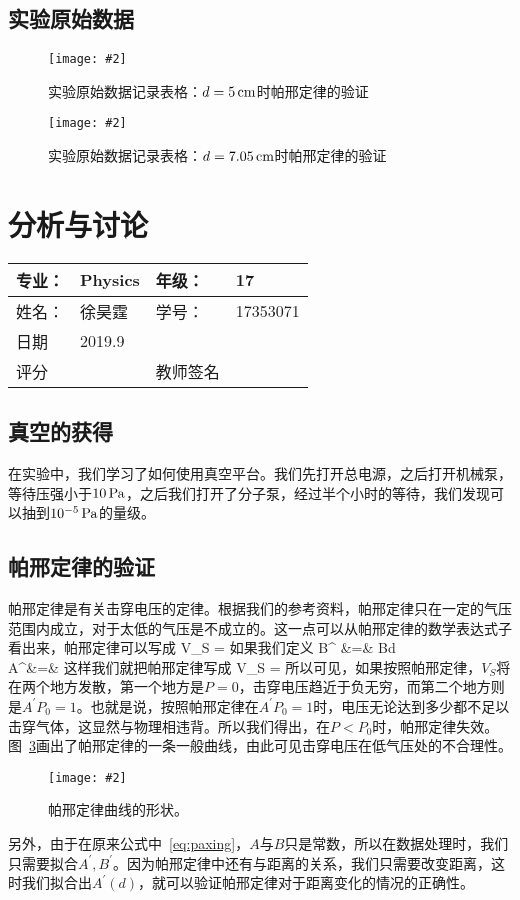 \documentclass{ctexart}
\newcommand{\cpic}[2]{
\begin{center}
\texttt{[image: \#2]}
\end{center}
}
\newcommand{\cpicn}[3]
{
\begin{figure}[H]
\cpic{#1}{#2}
\caption{#3\label{#2}}
\end{figure}
}
\begin{document}
\subsection{实验原始数据}
\cpicn{0.25}{original_1.jpg}{实验原始数据记录表格：$d = 5\,\mathrm{cm}$时帕邢定律的验证}
\cpicn{0.25}{original_2.jpg}{实验原始数据记录表格：$d = 7.05\,\mathrm{cm}$时帕邢定律的验证}
\newpage
\section{分析与讨论}
\begin{tabular}{|p{8em}|p{8em}|p{8em}|p{8em}|}
	\hline 
	专业：     &Physics       &年级：      & 17     \\
	\hline
	姓名：& 徐昊霆 &学号：&17353071  \\
	\hline
	日期&     2019.9               & &  \\
	\hline	
	评分 & & 教师签名 & \\
	\hline
\end{tabular}
\subsection{真空的获得}
在实验中，我们学习了如何使用真空平台。我们先打开总电源，之后打开机械泵，等待压强小于$10\,\mathrm{Pa}$，之后我们打开了分子泵，经过半个小时的等待，我们发现可以抽到$10^{-5}\,\mathrm{Pa}$的量级。
\subsection{帕邢定律的验证}
帕邢定律是有关击穿电压的定律。根据我们的参考资料，帕邢定律只在一定的气压范围内成立，对于太低的气压是不成立的。这一点可以从帕邢定律的数学表达式子看出来，帕邢定律可以写成
\beq\label{eq:paxing}
V_S = 
\eeq
如果我们定义
\bea
B^{\prime} &=& Bd  \label{eq:A} \\
A^{\prime}&=&  \label{eq:B}
\eea
这样我们就把帕邢定律写成
\beq
V_S = 
\eeq
所以可见，如果按照帕邢定律，$V_S$将在两个地方发散，第一个地方是$P = 0$，击穿电压趋近于负无穷，而第二个地方则是$A^{\prime}P_0 = 1$。也就是说，按照帕邢定律在$A^{\prime}P_0 = 1$时，电压无论达到多少都不足以击穿气体，这显然与物理相违背。所以我们得出，在$P<P_0$时，帕邢定律失效。图~\ref{general.jpeg}画出了帕邢定律的一条一般曲线，由此可见击穿电压在低气压处的不合理性。
\cpicn{0.5}{general.jpeg}{\color{red} 帕邢定律曲线的形状。}
\par  另外，由于在原来公式中~\ref{eq:paxing}，$A$与$B$只是常数，所以在数据处理时，我们只需要拟合$A^{\prime},B^{\prime}$。因为帕邢定律中还有与距离的关系，我们只需要改变距离，这时我们拟合出$A^{\prime}(d)$，就可以验证帕邢定律对于距离变化的情况的正确性。
\end{document}
